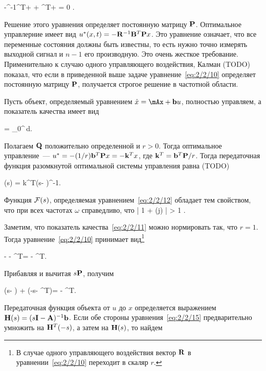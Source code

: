     -\mP\mB\mR^{-1}\mB^T\mP + \mP\mA + \mA^T\mP + \mQ = 0 \mbox{.}
\eeq

Решение этого уравнения определяет постоянную матрицу $\mathbf{P}$. Оптимальное управлерние имеет вид $u^{*}(x, t) = -\mathbf{R}^{-1}\mathbf{B}^T\mathbf{P} x$. Это уравнение означает, что все переменные состояния должны быть известны, то есть нужно точно измерять выходной сигнал и $n-1$ его производную. Это очень жесткое требование. Применительно к случаю одного управляющего воздействия, Калман (TODO) показал, что если в приведенной выше задаче уравнение~\ref{eq:2/2/10} определяет постоянную матрицу $\mathbf{P}$, получается строгое решение в частотной области.

\br

Пусть объект, определяемый уравнением $\dot{x} = \mAx + \mb u$, полностью управляем, а показатель качества имеет вид

    \funcF =  \int\limits_0^\infty {}\,d\tau \mbox{.}
\eeq

Полагаем $\mathbf{Q}$ положительно определенной и $r > 0$. Тогда оптимальное управление~--- $u^{*} = -(1/r) \mathbf{b}^T\mathbf{P} x = -\mathbf{k}^Tx$, где $\mathbf{k}^T = \mathbf{b}^T\mathbf{P} / r$. Тогда передаточная функция разомкнутой оптимальной системы управления равна (TODO)

    \funcT(s) = k^T(s\mI - \mA)^{-1}\mb \mbox{.}
\eeq

\begin{teo}
    Функция $\mathcal{F}(s)$, определяемая уравнением~\ref{eq:2/2/12} обладает тем свойством, что при всех частотах $\omega$ справедливо, что
    	\bigl| 1 + \funcT(j\omega) \bigr| > 1 \mbox{.}
	\eeq
\end{teo}


Заметим, что показатель качества~\ref{eq:2/2/11} можно нормировать так, что $r=1$. Тогда уравнение~\ref{eq:2/2/10} принимает вид\footnote{ В случае одного управляющего воздействия вектор $\mathbf{R}$ в уравнении~\ref{eq:2/2/10} переходит в скаляр $r$. }

    - \mP\mA - \mA^T\mP = \mQ - \mP\mb \mb^T\mP \mbox{.}
\eeq

Прибавляя и вычитая $s\mathbf{P}$, получим

    \mP(s\mI - \mA) + (-s\mI - \mA^T)\mP = \mQ - \mP\mb\mb^T\mP \mbox{.}
\eeq

Передаточная функция объекта от $u$ до $x$ определяется выражением $\mathbf{H}(s) = (s\mathbf{I}-\mathbf{A})^{-1}\mathbf{b}$. Если обе стороны уравнения~\vref{eq:2/2/15} предварительно умножить на $\mathbf{H}^T(-s)$, а затем на $\mathbf{H}(s)$, то найдем

